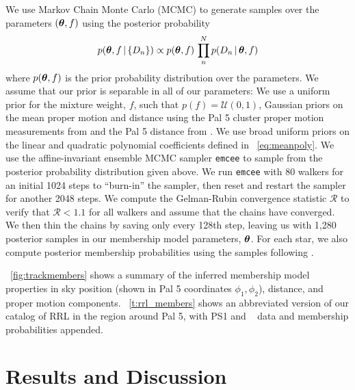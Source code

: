 \documentclass[twocolumn]{aastex63}
\begin{document}
We use Markov Chain Monte Carlo (MCMC) to generate samples over the parameters $(\boldsymbol{\theta}, f)$ using the posterior probability
\begin{equation}
    p(\bs{\theta}, f \given \{D_n\}) \propto p(\bs{\theta}, f) \, \prod_n^N p(D_n \given \bs{\theta}, f)
\end{equation}
where $p(\boldsymbol{\theta}, f)$ is the prior probability distribution over the parameters.
We assume that our prior is separable in all of our parameters: We use a uniform prior for the mixture weight, $f$, such that $p(f) = \mathcal{U}(0, 1)$, Gaussian priors on the mean proper motion and distance using the Pal 5 cluster proper motion measurements from \citet{Vasiliev:2019} and the Pal 5 distance from \citet{Kuepper:2015}.
We use broad uniform priors on the linear and quadratic polynomial coefficients defined in \equationname~\ref{eq:meanpoly}.
We use the affine-invariant ensemble MCMC sampler \texttt{emcee} \citep{emcee} to sample from the posterior probability distribution given above.
We run \texttt{emcee} with 80 walkers for an initial 1024 steps to ``burn-in'' the sampler, then reset and restart the sampler for another 2048 steps.
We compute the Gelman-Rubin convergence statistic $\mathcal{R}$ \citep{Gelman:1992} to verify that $\mathcal{R} < 1.1$ for all walkers and assume that the chains have converged.
We then thin the chains by saving only every 128th step, leaving us with 1,280 posterior samples in our membership model parameters, $\boldsymbol{\theta}$.
For each star, we also compute posterior membership probabilities using the samples following \citet{DFM:blog}.

\figurename~\ref{fig:trackmembers} shows a summary of the inferred membership model properties in sky position (shown in Pal 5 coordinates $\phi_1, \phi_2$), distance, and proper motion components.
\tablename~\ref{t:rrl_members} shows an abbreviated version of our catalog of RRL in the region around Pal 5, with PS1 and \Gaia~ data and membership probabilities appended.

\section{Results and Discussion} \label{sec:results}
\end{document}
